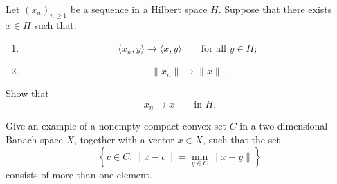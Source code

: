 \begin{problem}
    Let \((x_n)_{n\ge 1}\) be a sequence in a Hilbert space \(H\). Suppose
that there exists \(x\in H\) such that:
\begin{enumerate}
\item[(i)] 
\[
\langle x_n,y\rangle \to \langle x,y\rangle
\qquad
\text{for all }y\in H;
\]

\item[(ii)]
\[
\|x_n\|\to \|x\|.
\]
\end{enumerate}
Show that
\[
x_n\to x
\qquad
\text{in }H.
\]
\end{problem}

\begin{problem}
    Give an example of a nonempty compact convex set \(C\) in a two-dimensional
Banach space \(X\), together with a vector \(x\in X\), such that the set
\[
\left\{
c\in C:
\|x-c\|
=
\min_{y\in C}\|x-y\|
\right\}
\]
consists of more than one element.
\end{problem}